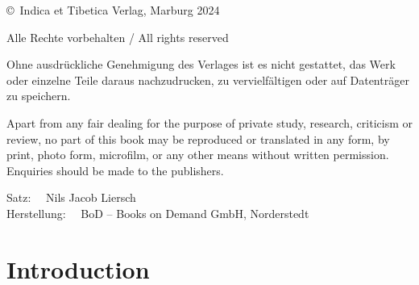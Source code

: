 \vskip 1cm

\noindent
\copyright\ Indica et Tibetica Verlag, Marburg 2024

\medskip

\noindent
Alle Rechte vorbehalten / All rights reserved

\medskip

\noindent
Ohne ausdrückliche Genehmigung des Verlages ist es nicht gestattet, das Werk oder einzelne Teile
daraus nachzudrucken, zu vervielfältigen oder auf Datenträger zu speichern.

\smallskip

\noindent
Apart from any fair dealing for the purpose of private study, research, criticism or review, no
part of this book may be reproduced or translated in any form, by print, photo form, microfilm, or
any other means without written permission. Enquiries should be made to the publishers.

\bigskip

\noindent
Satz: \ \ Nils Jacob Liersch \\
Herstellung: \ \ BoD – Books on Demand GmbH, Norderstedt  \\

\bigskip

\noindent

\normalsize

\newpage

\clearpage
\tableofcontents
\addtocounter{page}{-1}
\thispagestyle{empty}
\clearpage


\mainmatter
{}

\chapter{Introduction}
\cleardoublepage

